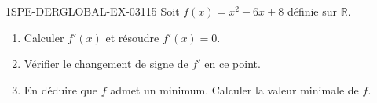 \begin{exercice}{1SPE-DERGLOBAL-EX-031}{1}{5}
Soit $f(x) = x^2 - 6x + 8$ définie sur $\mathbb{R}$.
\begin{enumerate}
\item Calculer $f'(x)$ et résoudre $f'(x) = 0$.
\item Vérifier le changement de signe de $f'$ en ce point.
\item En déduire que $f$ admet un minimum. Calculer la valeur minimale de $f$.
\end{enumerate}
\end{exercice}
